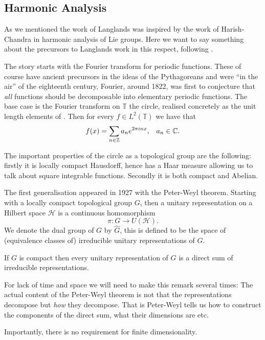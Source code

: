 \subsection{Harmonic Analysis}
As we mentioned the work of Langlands was inspired by the work of Harish-Chandra in harmonic analysis of Lie groups. Here we want to say something about the precursors to Langlands work in this respect, following \cite{follandCourseAbstractHarmonic2016a}.

The story starts with the Fourier transform for periodic functions. These of course have ancient precursors in the ideas of the Pythagoreans and were ``in the air'' of the eighteenth century, Fourier, around 1822, was first to conjecture that \textit{all} functions should be decomposable into elementary periodic functions. 
The base case is the Fourier transform on \(\mathbb{T}\) the circle, realised concretely as the unit length elements of \C. Then for every \(f\in L^2(\mathbb{T})\) we have that 
\[f(x) = \sum_{n\in \Z}a_ne^{2\pi i n x}, \;\;\; a_n\in \C.\]

The important properties of the circle as a topological group are the following: firstly it is locally compact Hausdorff, hence has a Haar measure allowing us to talk about square integrable functions. Secondly it is both compact and Abelian. 

The first generalisation appeared in 1927 with the Peter-Weyl theorem. Starting with a locally compact topological group \(G\), then a unitary representation on a Hilbert space \(\mathcal{H}\) is a continuous homomorphism 
\[\pi: G \to U(\mathcal{H}).\]
We denote the dual group of \(G\) by \(\hat{G}\), this is defined to be the space of (equivalence classes of) irreducible unitary representations of \(G\). 

\begin{Theorem}
	If \(G\) is compact then every unitary representation of \(G\) is a direct sum of irreducible representations. 
\end{Theorem} 
\begin{remark}
	For lack of time and space we will need to make this remark several times: The actual content of the Peter-Weyl theorem is not that the representations decompose but \textit{how} they decompose. That is Peter-Weyl tells us how to construct the components of the direct sum, what their dimensions are etc.
\end{remark}
Importantly, there is no requirement for finite dimensionality. 

